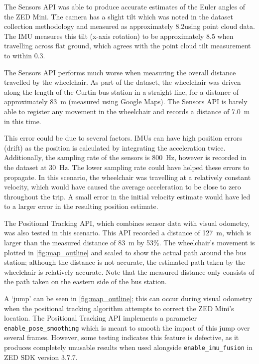 The Sensors API was able to produce accurate estimates
of the Euler angles of the ZED Mini. The camera has
a slight tilt which was noted in the dataset collection methodology
and measured as approximately 8.2\degree using point cloud data.
The IMU measures this tilt (x-axis rotation) to be approximately 8.5\degree
when travelling across flat ground, which agrees with the
point cloud tilt measurement to within 0.3\degree.

The Sensors API performs much worse when measuring the overall distance
travelled by the wheelchair. As part of the dataset, the wheelchair was
driven along the length of the Curtin bus station in a straight line,
for a distance of approximately \SI{83}{\metre} (measured using Google Maps).
The Sensors API is barely able to register any movement in the
wheelchair and records a distance of \SI{7.0}{\metre} in this time.

This error could be due to several factors. IMUs can have
high position errors (drift) as the position is calculated
by integrating the acceleration twice.
Additionally, the sampling rate of the sensors is \SI{800}{\hertz},
however is recorded in the dataset at \SI{30}{\hertz}. The lower
sampling rate could have helped these errors to propagate.
In this scenario, the wheelchair was travelling at a relatively constant
velocity, which would have caused the average acceleration to be close to zero throughout
the trip. A small error in the initial velocity estimate would have led to a larger
error in the resulting position estimate.

The Positional Tracking API, which combines sensor data with visual odometry,
was also tested in this scenario. This API recorded
a distance of \SI{127}{\metre}, which is larger
than the measured distance of \SI{83}{\metre} by 53\%.
The wheelchair's movement is plotted in \cref{fig:map_outline} and scaled to
show the actual path around the bus station; although the distance is not accurate,
the estimated path taken by the wheelchair is relatively accurate. Note that the measured distance only
consists of the path taken on the eastern side of the bus station.

A `jump' can be seen in \cref{fig:map_outline}; this can occur during visual odometry when
the positional tracking algorithm attempts to correct the ZED Mini's location. The Positional
Tracking API implements a parameter \texttt{enable\_pose\_smoothing} which is meant
to smooth the impact of this jump over several frames. However, some testing
indicates this feature is defective, as it produces completely unusable results
when used alongside \texttt{enable\_imu\_fusion} in ZED SDK version 3.7.7.

